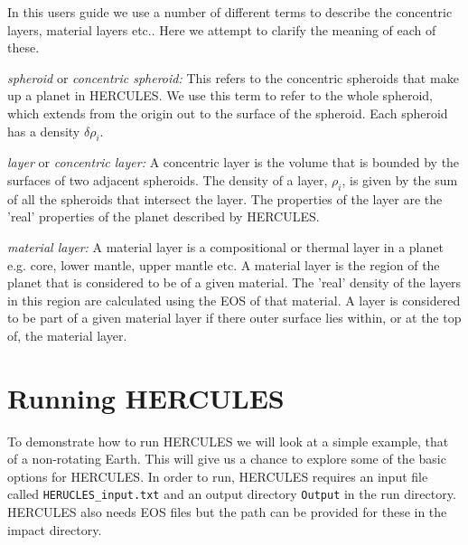 \documentclass[11pt, oneside]{article}   	%
\begin{document}
%
\vspace{0.5cm}
\begin{tcolorbox}[colback=white, colframe=red!75!black, title=Note on nomenclature]
In this users guide we use a number of different terms to describe the concentric layers, material layers etc.. 
Here we attempt to clarify the meaning of each of these.

\setlength{\parskip}{15pt}
\setlength{\leftskip}{1.5cm}
\setlength{\parindent}{-1.5cm}
{\it spheroid} or {\it concentric spheroid:} \newline
This refers to the concentric spheroids that make up a planet in HERCULES. 
We use this term to refer to the whole spheroid, which extends from the origin out to the surface of the spheroid.
Each spheroid has a density $\delta \rho_i$.

{\it layer} or {\it concentric layer:} \newline
 A concentric layer is the volume that is bounded by the surfaces of two adjacent spheroids.
The density of a layer, $\rho_i$, is given by the sum of all the spheroids that intersect the layer.
The properties of the layer are the 'real' properties of the planet described by HERCULES.


{\it material layer:} \newline  
A material layer is a compositional or thermal layer in a planet e.g. core, lower mantle, upper mantle etc.
A material layer is the region of the planet that is considered to be of a given material. 
The 'real' density of the layers in this region are calculated using the EOS of that material.
A layer is considered to be part of a given material layer if there outer surface lies within, or at the top of, the material layer.


\setlength{\leftskip}{0pt}
\setlength{\parskip}{0 pt}
\setlength{\parindent}{15pt}

\end{tcolorbox}

\section{Running HERCULES}
\label{sec:running}

To demonstrate how to run HERCULES we will look at a simple example, that of a non-rotating Earth.
This will give us a chance to explore some of the basic options for HERCULES.
In order to run, HERCULES requires an input file called \texttt{HERUCLES\_input.txt} and an output directory \texttt{Output} in the run directory. HERCULES also needs EOS files but the path can be provided for these in the impact directory.
\end{document}
